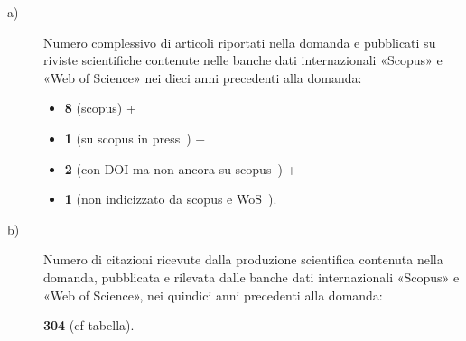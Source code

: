 \documentclass[11pt,a4paper,sans]{moderncv}        %
\newcommand{\commento}[1]{{\footnotesize{\emph{\textcolor{blue}{Commento: #1}}}}}
\begin{document}
\begin{description}
\item[a)] 
Numero complessivo di articoli riportati nella domanda e pubblicati su riviste scientifiche contenute nelle banche dati internazionali «Scopus» e «Web of Science» nei dieci anni precedenti alla domanda: 
\begin{itemize}
\item \textbf{8} (scopus\cite{Cattaneo2008258, Cattaneo2010404, Castiglione2012771, Cattaneo20132437, Castiglione2013216, Castiglione2013265, Cattaneo2016315, Cattaneo20171}) +

\item \textbf{1} (su scopus in press~\cite{ Cattaneo2017}) +

\item \textbf{2} (con DOI ma non ancora su scopus~\cite{BioInformaticsAN-2017, LNEC:TBD2017}) +

\item \textbf{1} (non indicizzato da scopus e WoS~\cite{Bioinformation:GRIMD14}).
\end{itemize}


\item[b)] 
Numero di citazioni ricevute dalla produzione scientifica contenuta nella domanda, pubblicata e rilevata dalle banche dati internazionali «Scopus» e «Web of Science», nei quindici anni precedenti alla domanda:

{\bfseries 304} (cf tabella).

\end{description}
\end{document}
